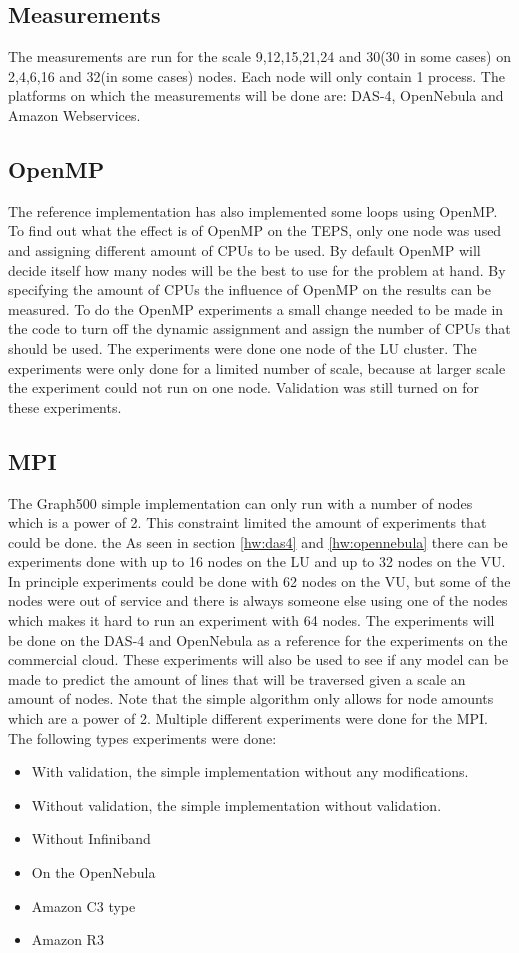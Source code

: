 \subsection{Measurements}
The measurements are run for the scale 9,12,15,21,24 and 30(30 in some cases) on 2,4,6,16 and 32(in some cases) nodes. Each node will only contain 1 process. The platforms on which the measurements will be done are: DAS-4, OpenNebula and Amazon Webservices.

\subsection{OpenMP}
The reference  implementation has also implemented some loops using OpenMP. To find out what the effect is of OpenMP on the TEPS, only one node was used and assigning different amount of CPUs to be used. By default OpenMP will decide itself how many nodes will be the best to use for the problem at hand. By specifying the amount of CPUs the influence of OpenMP on the results can be measured. To do the OpenMP experiments a small change needed to be made in the code to turn off the dynamic assignment and assign the number of CPUs that should be used. The experiments were done one node of the LU cluster. The experiments were only done for a limited number of scale, because at larger scale the experiment could not run on one node. Validation was still turned on for these experiments.

\subsection{MPI}
The Graph500 simple implementation can only run with a number of nodes which is a power of 2. This constraint limited the amount of experiments that could be done. the As seen in section \ref{hw:das4} and \ref{hw:opennebula} there can be experiments done with up to 16 nodes on the LU and up to 32 nodes on the VU. In principle experiments could be done with 62 nodes on the VU, but some of the nodes were out of service and there is always someone else using one of the nodes which makes it hard to run an experiment with 64 nodes.
The experiments will be done on the DAS-4 and OpenNebula as a reference for the experiments on the commercial cloud. These experiments will also be used to see if any model can be made to predict the amount of lines that will be traversed given a scale an amount of nodes. Note that the simple algorithm only allows for node amounts which are a power of 2. Multiple different experiments were done for the MPI. The following types experiments were done:
\begin{itemize}
	\item With validation, the simple implementation without any modifications.
	\item Without validation, the simple implementation without validation.
	\item Without Infiniband
	\item On the OpenNebula
	\item Amazon C3 type
	\item Amazon R3
\end{itemize}



